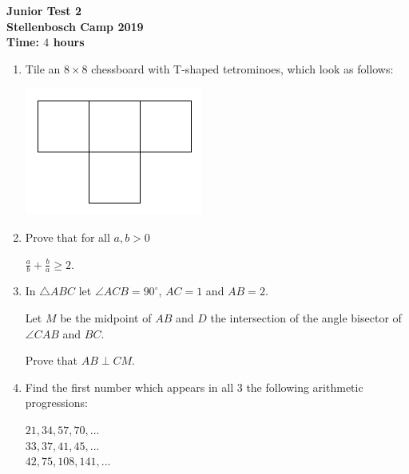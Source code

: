 \documentclass{article}
\begin{document}
\thispagestyle{empty}

\begin{center}
  \textbf{\Large Junior Test 2}
  \\ \vspace{1em}
  \textbf{\large Stellenbosch Camp 2019}
  \\ \vspace{1em}
  \textbf{\large Time: $4$ hours}
\end{center}

\vspace{6.81mm}

\begin{enumerate}[1.]

\item %
Tile an $8 \times 8$ chessboard with T-shaped tetrominoes, which look as follows:
\begin{center}
	\includegraphics[scale=0.3]{test_2_q_1.png}
\end{center}


\vspace{6.81mm}

\item %
Prove that for all $a, b > 0$
\begin{center}
$\frac{a}{b} + \frac{b}{a} \geq 2.$ 
\end{center}
\vspace{6.81mm}


\item %
In $\triangle ABC$ let $\angle ACB = 90^\circ$, $AC = 1$ and $AB = 2$.

Let $M$ be the midpoint of $AB$ and $D$ the intersection of the angle bisector of $\angle CAB$ and $BC$.

Prove that $AB \perp CM$.


\vspace{6.81mm}


\item %
Find the first number which appears in all 3 the following arithmetic progressions:
\begin{center}
	$21, 34, 57, 70,...$\\
	$33, 37, 41, 45,...$\\
	$42, 75, 108, 141,...$
\end{center}
\vspace{6.81mm}


\end{enumerate}
\end{document}
